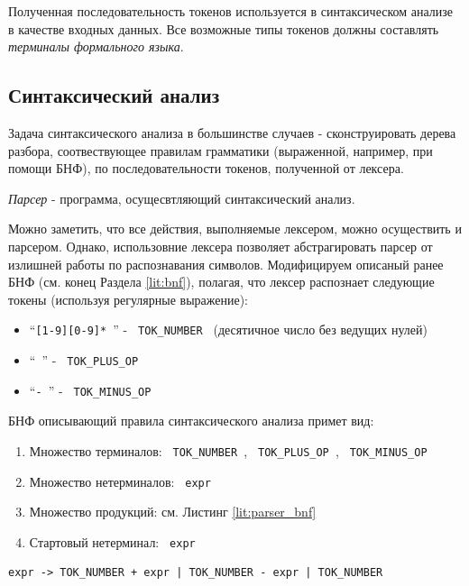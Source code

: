 Полученная последовательность токенов используется в синтаксическом анализе в качестве входных данных. Все возможные типы токенов должны составлять \textit{терминалы формального языка}.

\subsection{Синтаксический анализ}
Задача синтаксического анализа в большинстве случаев - сконструировать дерева разбора, соотвествующее правилам грамматики (выраженной, например, при помощи БНФ), по последовательности токенов, полученной от лексера.

\textit{Парсер} - программа, осущесвтляющий синтаксический анализ. 

Можно заметить, что все действия, выполняемые лексером, можно осуществить и парсером. Однако,  использовние лексера позволяет абстрагировать парсер от излишней работы по распознавания символов. Модифицируем описаный ранее БНФ (см. конец Раздела \ref{lit:bnf}), полагая, что лексер распознает следующие токены (используя регулярные выражение):
\begin{itemize}
    \item \enquote{\texttt{[1-9][0-9]* }} - \texttt{ TOK_NUMBER } (десятичное число без ведущих нулей)
    \item \enquote{\texttt{\+ }} - \texttt{ TOK_PLUS_OP }
    \item \enquote{\texttt{- }} - \texttt{ TOK_MINUS_OP }
\end{itemize}

БНФ описывающий правила синтаксического анализа примет вид:
\begin{enumerate}
    \item Множество терминалов: \texttt{ TOK_NUMBER }, \texttt{ TOK_PLUS_OP }, \texttt{ TOK_MINUS_OP }
    \item Множество нетерминалов: \texttt{ expr }
    \item Множество продукций: см. Листинг \ref{lit:parser_bnf}
    \item Стартовый нетерминал: \texttt{ expr }
\end{enumerate}

\begin{code}
\label{lit:parser_bnf}
\begin{verbatim}
expr -> TOK_NUMBER + expr | TOK_NUMBER - expr | TOK_NUMBER
\end{verbatim}
\end{code}

